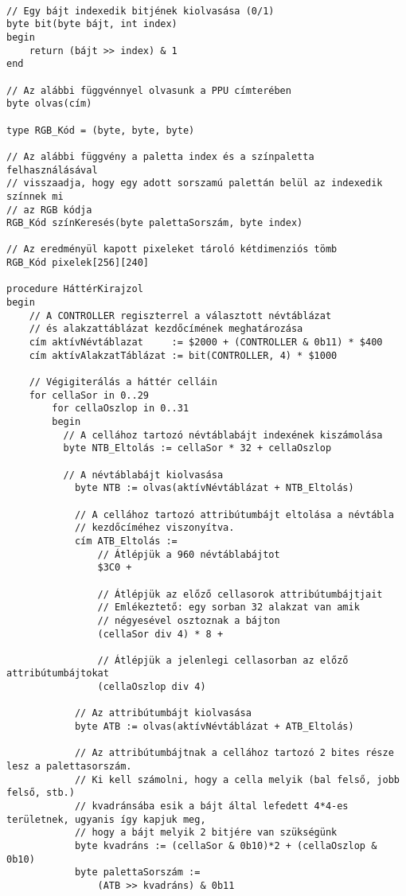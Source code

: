 \begin{lstlisting}

// Egy bájt indexedik bitjének kiolvasása (0/1)
byte bit(byte bájt, int index)
begin
	return (bájt >> index) & 1
end

// Az alábbi függvénnyel olvasunk a PPU címterében
byte olvas(cím)

type RGB_Kód = (byte, byte, byte)

// Az alábbi függvény a paletta index és a színpaletta felhasználásával 
// visszaadja, hogy egy adott sorszamú palettán belül az indexedik színnek mi
// az RGB kódja
RGB_Kód színKeresés(byte palettaSorszám, byte index)

// Az eredményül kapott pixeleket tároló kétdimenziós tömb
RGB_Kód pixelek[256][240]

procedure HáttérKirajzol
begin
	// A CONTROLLER regiszterrel a választott névtáblázat
	// és alakzattáblázat kezdőcímének meghatározása
	cím aktívNévtáblazat     := $2000 + (CONTROLLER & 0b11) * $400
	cím aktívAlakzatTáblázat := bit(CONTROLLER, 4) * $1000
	
	// Végigiterálás a háttér celláin
	for cellaSor in 0..29
		for cellaOszlop in 0..31
		begin
		  // A cellához tartozó névtáblabájt indexének kiszámolása
		  byte NTB_Eltolás := cellaSor * 32 + cellaOszlop 
		  
		  // A névtáblabájt kiolvasása
			byte NTB := olvas(aktívNévtáblázat + NTB_Eltolás)
			
			// A cellához tartozó attribútumbájt eltolása a névtábla
			// kezdőcíméhez viszonyítva.
			cím ATB_Eltolás := 
				// Átlépjük a 960 névtáblabájtot 
				$3C0 +		
								
				// Átlépjük az előző cellasorok attribútumbájtjait
				// Emlékeztető: egy sorban 32 alakzat van amik 
				// négyesével osztoznak a bájton
				(cellaSor div 4) * 8 + 	
					
				// Átlépjük a jelenlegi cellasorban az előző attribútumbájtokat
				(cellaOszlop div 4)         
				
			// Az attribútumbájt kiolvasása
			byte ATB := olvas(aktívNévtáblázat + ATB_Eltolás)
			
			// Az attribútumbájtnak a cellához tartozó 2 bites része lesz a palettasorszám.
			// Ki kell számolni, hogy a cella melyik (bal felső, jobb felső, stb.)
			// kvadránsába esik a bájt által lefedett 4*4-es területnek, ugyanis így kapjuk meg,
			// hogy a bájt melyik 2 bitjére van szükségünk
			byte kvadráns := (cellaSor & 0b10)*2 + (cellaOszlop & 0b10) 
			byte palettaSorszám :=
				(ATB >> kvadráns) & 0b11
				

\end{lstlisting}
